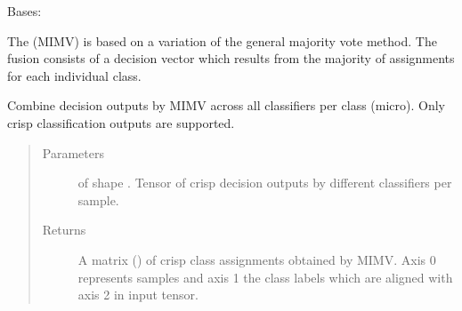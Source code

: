 \documentclass[letterpaper,10pt,english]{sphinxmanual}
\begin{document}
\begin{fulllineitems}
\label{\detokenize{pusion.core.micro_majority_vote_combiner:pusion.core.micro_majority_vote_combiner.MicroMajorityVoteCombiner}}
\sphinxAtStartPar
Bases: {\hyperref[\detokenize{pusion.core.combiner:pusion.core.combiner.UtilityBasedCombiner}]{}}

\sphinxAtStartPar
The {\hyperref[\detokenize{pusion.core.micro_majority_vote_combiner:pusion.core.micro_majority_vote_combiner.MicroMajorityVoteCombiner}]{}} (MIMV) is based on a variation of the general majority vote method.
The fusion consists of a decision vector which results from the majority of assignments for each individual class.

\begin{fulllineitems}
\label{\detokenize{pusion.core.micro_majority_vote_combiner:pusion.core.micro_majority_vote_combiner.MicroMajorityVoteCombiner.combine}}
\sphinxAtStartPar
Combine decision outputs by MIMV across all classifiers per class (micro).
Only crisp classification outputs are supported.
\begin{quote}\begin{description}
\item[{Parameters}] \leavevmode
\sphinxAtStartPar
{} \textendash{}  of shape .
Tensor of crisp decision outputs by different classifiers per sample.

\item[{Returns}] \leavevmode
\sphinxAtStartPar
A matrix () of crisp class assignments obtained by MIMV. Axis 0 represents samples and
axis 1 the class labels which are aligned with axis 2 in  input tensor.

\end{description}\end{quote}

\end{fulllineitems}


\end{fulllineitems}
\end{document}
